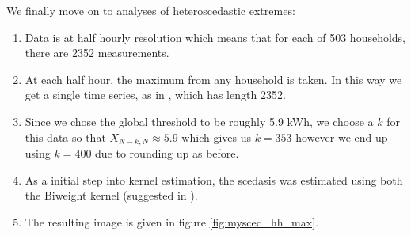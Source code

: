 \documentclass[a4paper]{article}
\begin{document}




We finally move on to analyses of heteroscedastic extremes:
\begin{enumerate}
\item Data is at half hourly resolution which means that for each of 503 households, there are 2352 measurements.
\item At each half hour, the maximum from any household is taken. In this way we get a single time series, as in \cite{einmahl16}, which has length 2352.
\item Since we chose the global threshold to be roughly 5.9 kWh, we choose a $k$ for this data so that $X_{N-k,N} \approx 5.9$ which gives us $k=353$ however we end up using $k=400$ due to rounding up as before. 
\item As a initial step into kernel estimation, the scedasis was estimated using both the Biweight kernel (suggested in \cite{einmahl16}).
\item The resulting image is given in figure \ref{fig:mysced_hh_max}.
\end{enumerate}
\end{document}
